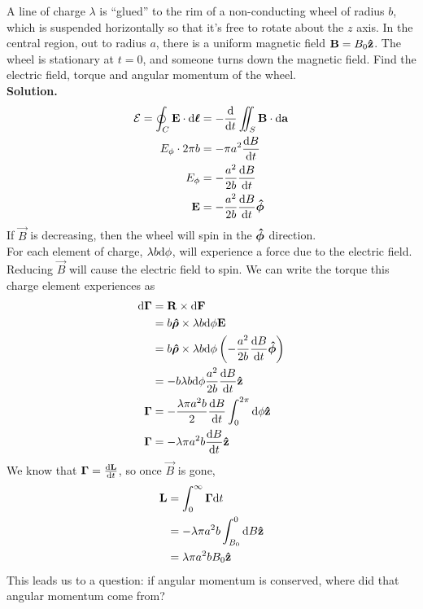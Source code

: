 \documentclass[a4paper]{article}
\begin{document}
\begin{eg}
	A line of charge $\lambda$ is ``glued'' to the rim of a non-conducting
	wheel of radius $b$, which is suspended horizontally so that it's
	free to rotate about the $z$ axis. In the central region, out to radius
	$a$, there is a uniform magnetic field $\boldsymbol{\mathbf{B}} = B_0\boldsymbol{\mathbf{\hat{z}}}$. The wheel
	is stationary at $t=0$, and someone turns down the magnetic field.
	Find the electric field, torque and angular momentum of the wheel.\\
	\textbf{Solution.}
	\begin{align*}
		\mathcal{E} = \oint_C \boldsymbol{\mathbf{E}} \cdot \mathrm{d}\boldsymbol{\mathbf{\ell}} &=
			-\frac{\mathrm{d} }{\mathrm{d} t}\iint_S \boldsymbol{\mathbf{B}} \cdot \mathrm{d}\boldsymbol{\mathbf{a}}\\
		E_\phi\cdot2\pi b &= -\pi a^2 \frac{\mathrm{d} B}{\mathrm{d} t}\\
		E_\phi &= -\frac{a^2}{2b} \frac{\mathrm{d} B}{\mathrm{d} t}\\
		\boldsymbol{\mathbf{E}} &= -\frac{a^2}{2b} \frac{\mathrm{d} B}{\mathrm{d} t} \boldsymbol{\mathbf{\hat{\phi}}}
	\end{align*}
	If $\vec{B}$ is decreasing, then the wheel will spin in the
	$\boldsymbol{\mathbf{\hat{\phi}}}$ direction.\\
	For each element of charge, $\lambda b\mathrm{d}\phi$, will experience a force
	due to the electric field. Reducing $\vec{B}$ will cause the electric
	field to spin. We can write the torque this charge element experiences
	as
	\begin{align*}
		\mathrm{d}\boldsymbol{\mathbf{\Gamma}} &= \boldsymbol{\mathbf{R}}\times\mathrm{d}\boldsymbol{\mathbf{F}}\\
			       &= b\boldsymbol{\mathbf{\hat{\rho}}} \times \lambda b\mathrm{d}\phi \boldsymbol{\mathbf{E}}\\
			       &= b\boldsymbol{\mathbf{\hat{\rho}}} \times \lambda b\mathrm{d}\phi \left(
				-\frac{a^2}{2b}\frac{\mathrm{d} B}{\mathrm{d} t}\boldsymbol{\mathbf{\hat{\phi}}}\right)\\
				&=-b\lambda b\mathrm{d}\phi\frac{a^2}{2b}\frac{\mathrm{d} B}{\mathrm{d} t}\boldsymbol{\mathbf{\hat{z}}}\\
		\boldsymbol{\mathbf{\Gamma}} &= -\frac{\lambda\pi a^2b}{2}\frac{\mathrm{d} B}{\mathrm{d} t}
			\int_0^{2\pi}\mathrm{d}\phi\boldsymbol{\mathbf{\hat{z}}}\\
		\boldsymbol{\mathbf{\Gamma}} &= -\lambda\pi a^2b\frac{\mathrm{d} B}{\mathrm{d} t}\boldsymbol{\mathbf{\hat{z}}}
	\end{align*}
	We know that $\boldsymbol{\mathbf{\Gamma}} = \frac{\mathrm{d} \boldsymbol{\mathbf{L}}}{\mathrm{d} t}$, so once $\vec{B}$ is
	gone,
	\begin{align*}
		\boldsymbol{\mathbf{L}} &= \int_0^\infty \boldsymbol{\mathbf{\Gamma}}\mathrm{d} t\\
			&= -\lambda\pi a^2b\int_{B_0}^0\mathrm{d} B\boldsymbol{\mathbf{\hat{z}}}\\
			&= \lambda \pi a^2 b B_0 \boldsymbol{\mathbf{\hat{z}}}
	\end{align*}
	This leads us to a question: if angular momentum is conserved, where
	did that angular momentum come from?
\end{eg}
\end{document}
